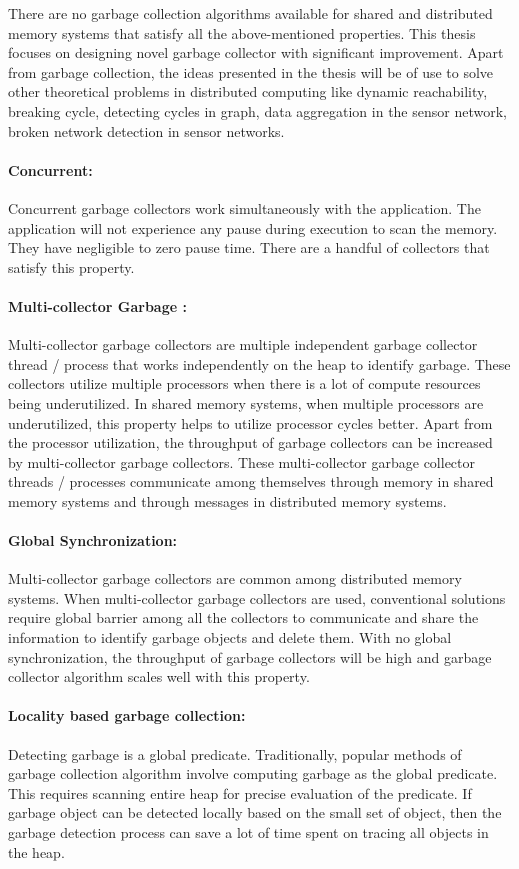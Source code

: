 There are no garbage collection algorithms available for shared and distributed memory systems that satisfy all the above-mentioned properties.  This thesis focuses on designing novel garbage collector with significant improvement. Apart from garbage collection, the ideas presented in the thesis will be of use to solve other theoretical problems in distributed computing like dynamic reachability, breaking cycle, detecting cycles in graph, data aggregation in the sensor network, broken network detection in sensor networks.


\paragraph{Concurrent:}
Concurrent garbage collectors work simultaneously with the application. The application will not experience any pause during execution to scan the memory. They
have negligible to zero pause time. There are a handful of collectors that satisfy this property. 
\paragraph{Multi-collector Garbage :}
Multi-collector garbage collectors are multiple independent garbage collector thread / process that works independently on the heap to identify garbage. These collectors utilize multiple processors when there is a lot of compute resources being underutilized. In shared memory systems, when multiple processors are underutilized, this property helps to utilize processor cycles better. Apart from the processor utilization, the throughput of garbage collectors can be increased by multi-collector garbage collectors. These multi-collector garbage collector threads / processes communicate among themselves through memory in shared memory systems and through messages in distributed memory systems.
\paragraph{Global Synchronization:}
Multi-collector garbage collectors are common among distributed memory systems. 
When multi-collector garbage collectors are used, conventional solutions require global barrier among all the collectors to communicate and share the information to identify garbage objects and delete them. With no global synchronization, the throughput of garbage collectors will be high and garbage collector algorithm scales well with this property.
\paragraph{Locality based garbage collection:}
Detecting garbage is a global predicate. Traditionally, popular methods of garbage collection algorithm involve computing garbage as the global predicate. This requires scanning entire heap for precise evaluation of the predicate. If garbage object can be detected locally based on the small set of object, then the garbage detection process can save a lot of time spent on tracing all objects in the heap.
